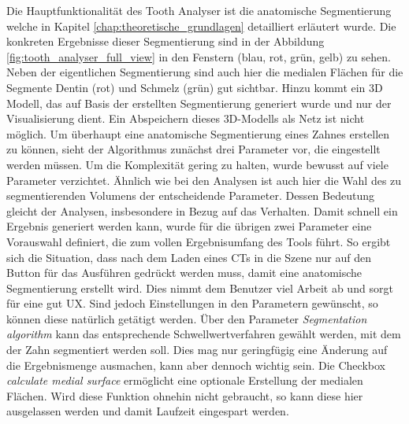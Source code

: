 Die Hauptfunktionalität des Tooth Analyser ist die anatomische Segmentierung welche
in Kapitel \ref{chap:theoretische_grundlagen} detailliert erläutert wurde. Die
konkreten Ergebnisse dieser Segmentierung sind in der Abbildung
\ref{fig:tooth_analyser_full_view} in den Fenstern (blau, rot, grün, gelb) zu sehen.
Neben der eigentlichen Segmentierung sind auch hier die medialen Flächen für die
Segmente Dentin (rot) und Schmelz (grün) gut sichtbar. Hinzu kommt ein \ac{3D}
Modell, das auf Basis der erstellten Segmentierung generiert wurde und nur der Visualisierung
dient. Ein Abspeichern dieses \ac{3D}-Modells als Netz ist nicht möglich. Um
überhaupt eine anatomische Segmentierung eines Zahnes erstellen zu können, sieht
der Algorithmus zunächst drei Parameter vor, die eingestellt werden müssen. Um die
Komplexität gering zu halten, wurde bewusst auf viele Parameter verzichtet. Ähnlich
wie bei den Analysen ist auch hier die Wahl des zu segmentierenden Volumens der entscheidende
Parameter. Dessen Bedeutung gleicht der Analysen, insbesondere in Bezug auf das Verhalten.
Damit schnell ein Ergebnis generiert werden kann, wurde für die übrigen zwei Parameter
eine Vorauswahl definiert, die zum vollen Ergebnisumfang des Tools führt. So ergibt
sich die Situation, dass nach dem Laden eines \ac{CT}s in die Szene nur auf den
Button für das Ausführen gedrückt werden muss, damit eine anatomische Segmentierung
erstellt wird. Dies nimmt dem Benutzer viel Arbeit ab und sorgt für eine gut \ac{UX}.
Sind jedoch Einstellungen in den Parametern gewünscht, so können diese natürlich
getätigt werden. Über den Parameter \textit{Segmentation algorithm} kann das entsprechende
Schwellwertverfahren gewählt werden, mit dem der Zahn segmentiert werden soll. Dies
mag nur geringfügig eine Änderung auf die Ergebnismenge ausmachen, kann aber
dennoch wichtig sein. Die Checkbox \textit{calculate medial surface} ermöglicht
eine optionale Erstellung der medialen Flächen. Wird diese Funktion ohnehin nicht
gebraucht, so kann diese hier ausgelassen werden und damit Laufzeit eingespart
werden.

